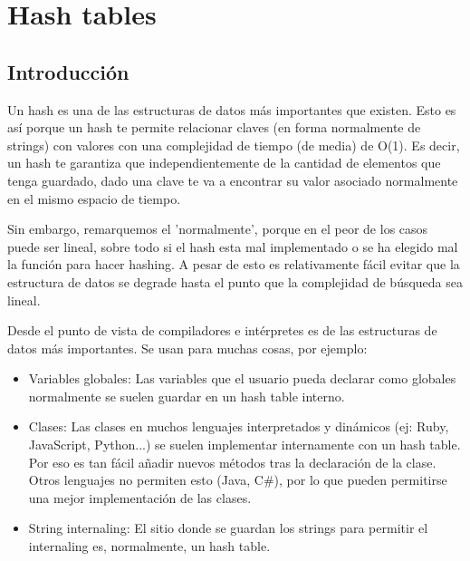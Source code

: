\chapter{Hash tables}

\newpage

\section{Introducción}

Un hash es una de las estructuras de datos más importantes que existen.  Esto es así porque un hash te permite relacionar claves (en forma normalmente de strings) con valores con una complejidad de tiempo (de media) de O(1).  Es decir, un hash te garantiza que independientemente de la cantidad de elementos que tenga guardado, dado una clave te va a encontrar su valor asociado normalmente en el mismo espacio de tiempo.

Sin embargo, remarquemos el 'normalmente',  porque en el peor de los casos puede ser lineal,  sobre todo si el hash esta mal implementado o se ha elegido mal la función para hacer hashing.  A pesar de esto es relativamente fácil evitar que la estructura de datos se degrade hasta el punto que la complejidad de búsqueda sea lineal.

Desde el punto de vista de compiladores e intérpretes es de las estructuras de datos más importantes.  Se usan para muchas cosas,  por ejemplo:

\begin{itemize}

\item Variables globales: Las variables que el usuario pueda declarar como globales normalmente se suelen guardar en un hash table interno.

\item Clases: Las clases en muchos lenguajes interpretados y dinámicos (ej: Ruby,  JavaScript,  Python...) se suelen implementar internamente con un hash table.  Por eso es tan fácil añadir nuevos métodos tras la declaración de la clase.  Otros lenguajes no permiten esto (Java,  C\#),  por lo que pueden permitirse una mejor implementación de las clases.

\item String internaling: El sitio donde se guardan los strings para permitir el internaling es,  normalmente,  un hash table.

\end{itemize}

